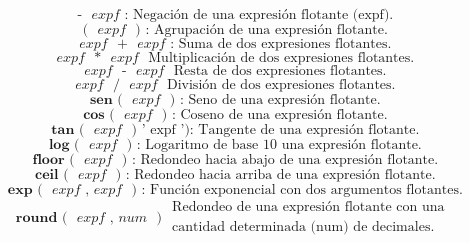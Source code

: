 \documentclass[11pt]{scrartcl}
\begin{document}
\begin{equation*}
\textbf{ - } \textit{ expf }
\text{: Negaci\'on de una expresi\'on flotante (expf).}
\end{equation*}
\begin{equation*}
\textbf{ ( } \textit{ expf }\textbf{ ) }\text{: Agrupaci\'on de una expresi\'on flotante.}
\end{equation*}
\begin{equation*}
\textit{ expf } \textbf{ + } \textit{ expf }\text{: Suma de dos expresiones flotantes.}
\end{equation*}
\begin{equation*}
\textit{ expf } \textbf{ * } \textit{ expf }\text{ Multiplicación de dos expresiones flotantes.}
\end{equation*}
\begin{equation*}
\textit{ expf } \textbf{ - } \textit{ expf }\text{ Resta de dos expresiones flotantes.}
\end{equation*}
\begin{equation*}
\textit{ expf } \textbf{ / } \textit{ expf }\text{ División de dos expresiones flotantes.}
\end{equation*}
\begin{equation*}
\textbf{ sen ( } \textit{ expf } \textbf{ ) }\text{: Seno de una expresión flotante.}
\end{equation*}
\begin{equation*}
\textbf{ cos ( } \textit{ expf } \textbf{ ) }\text{: Coseno de una expresión flotante.}
\end{equation*}
\begin{equation*}
\textbf{ tan ( } \textit{ expf } \textbf{ ) }\text{' expf '): Tangente de una expresión flotante.}
\end{equation*}
\begin{equation*}
\textbf{ log ( } \textit{ expf } \textbf{ ) }\text{: Logaritmo de base 10 una expresión flotante.}
\end{equation*}
\begin{equation*}
\textbf{ floor ( } \textit{ expf } \textbf{ ) }\text{: Redondeo hacia abajo de una expresión flotante.}
\end{equation*}
\begin{equation*}
\textbf{ ceil ( } \textit{ expf } \textbf{ ) }\text{: Redondeo hacia arriba de una expresión flotante.}
\end{equation*}
\begin{equation*}
\textbf{ exp ( } \textit{ expf , expf } \textbf{ ) }\text{: Función exponencial con dos argumentos flotantes.}
\end{equation*}
\begin{equation*}
\textbf{ round ( } \textit{ expf , num } \textbf{ ) }
\begin{aligned}
\text{Redondeo de una expresión flotante con una } \\
\text{cantidad determinada (num) de decimales.}
\end{aligned}
\end{equation*}
\end{document}
